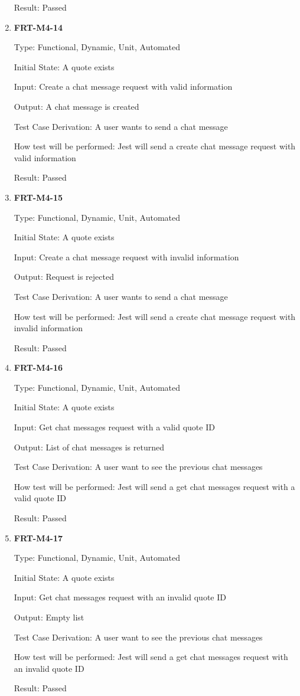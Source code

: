 \documentclass[12pt, titlepage]{article}
\begin{document}
\begin{enumerate}
	      Result: Passed

	\item \textbf{FRT-M4-14}

	      Type: Functional, Dynamic, Unit, Automated

	      Initial State: A quote exists

	      Input: Create a chat message request with valid information

	      Output: A chat message is created

	      Test Case Derivation: A user wants to send a chat message

	      How test will be performed: Jest will send a create chat message request with valid information

	      Result: Passed

	\item \textbf{FRT-M4-15}

	      Type: Functional, Dynamic, Unit, Automated

	      Initial State: A quote exists

	      Input: Create a chat message request with invalid information

	      Output: Request is rejected

	      Test Case Derivation: A user wants to send a chat message

	      How test will be performed: Jest will send a create chat message request with invalid information

	      Result: Passed

	\item \textbf{FRT-M4-16}

	      Type: Functional, Dynamic, Unit, Automated

	      Initial State: A quote exists

	      Input: Get chat messages request with a valid quote ID

	      Output: List of chat messages is returned

	      Test Case Derivation: A user want to see the previous chat messages

	      How test will be performed: Jest will send a get chat messages request with a valid quote ID

	      Result: Passed

	\item \textbf{FRT-M4-17}

	      Type: Functional, Dynamic, Unit, Automated

	      Initial State: A quote exists

	      Input: Get chat messages request with an invalid quote ID

	      Output: Empty list

	      Test Case Derivation: A user want to see the previous chat messages

	      How test will be performed: Jest will send a get chat messages request with an invalid quote ID

	      Result: Passed

\end{enumerate}
\end{document}
